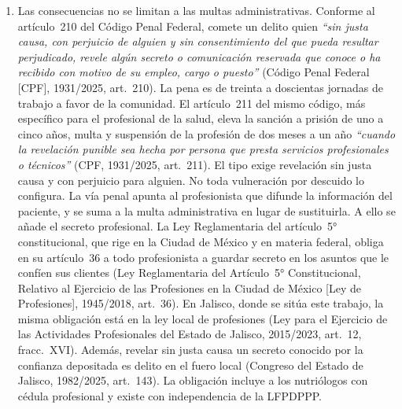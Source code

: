 \documentclass[12pt, a4paper]{article}
\begin{document}
\begin{enumerate}[label=\Roman*.]
\item Las consecuencias no se limitan a las multas administrativas.
  Conforme al artículo~210 del Código Penal Federal, comete un delito
  quien \textit{``sin justa causa, con perjuicio de alguien y sin
  consentimiento del que pueda resultar perjudicado, revele algún
  secreto o comunicación reservada que conoce o ha recibido con
  motivo de su empleo, cargo o puesto''} (Código Penal Federal [CPF],
  1931/2025, art.~210). La pena es de treinta a doscientas jornadas
  de trabajo a favor de la comunidad. El artículo~211 del mismo
  código, más específico para el profesional de la salud, eleva la
  sanción a prisión de uno a cinco años, multa y suspensión de la
  profesión de dos meses a un año \textit{``cuando la revelación
  punible sea hecha por persona que presta servicios profesionales o
  técnicos''} (CPF, 1931/2025, art.~211). El tipo exige revelación
  sin justa causa y con perjuicio para alguien. No toda vulneración
  por descuido lo configura. La vía penal apunta al profesionista que
  difunde la información del paciente, y se suma a la multa
  administrativa en lugar de sustituirla. A ello se añade el secreto
  profesional. La Ley Reglamentaria del artículo~5° constitucional,
  que rige en la Ciudad de México y en materia federal, obliga en su
  artículo~36 a todo profesionista a guardar secreto en los asuntos
  que le confíen sus clientes (Ley Reglamentaria del Artículo~5°
  Constitucional, Relativo al Ejercicio de las Profesiones en la
  Ciudad de México [Ley de Profesiones], 1945/2018, art.~36). En Jalisco,
  donde se sitúa este trabajo, la misma obligación está en la ley local de
  profesiones (Ley para el Ejercicio de las Actividades Profesionales del
  Estado de Jalisco, 2015/2023, art.~12, fracc.~XVI). Además, revelar sin
  justa causa un secreto conocido por la confianza depositada es delito en
  el fuero local (Congreso del Estado de Jalisco, 1982/2025, art.~143). La
  obligación incluye a los nutriólogos con cédula
  profesional y existe con independencia de la LFPDPPP.
 

\end{enumerate}
\end{document}
